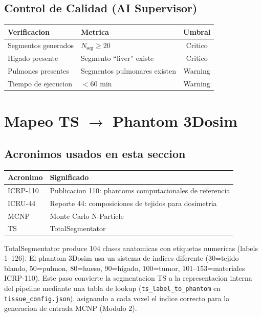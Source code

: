 \documentclass[12pt,a4paper]{article}
\begin{document}
\subsection{Control de Calidad (AI Supervisor)}

\begin{table}[H]
\centering
\begin{tabular}{llc}
\toprule
\textbf{Verificacion} & \textbf{Metrica} & \textbf{Umbral} \\
\midrule
Segmentos generados & $N_{\text{seg}} \geq 20$ & Critico \\
Higado presente & Segmento ``liver'' existe & Critico \\
Pulmones presentes & Segmentos pulmonares existen & Warning \\
Tiempo de ejecucion & $< 60$ min & Warning \\
\bottomrule
\end{tabular}
\end{table}

\newpage

\section{Mapeo TS \texorpdfstring{$\to$}{a} Phantom 3Dosim}
\label{sec:mapeo}

\subsection*{Acronimos usados en esta seccion}
\begin{tabular}{ll}
\toprule
\textbf{Acronimo} & \textbf{Significado} \\
\midrule
ICRP-110 & Publicacion 110: phantoms computacionales de referencia \\
ICRU-44 & Reporte 44: composiciones de tejidos para dosimetria \\
MCNP & Monte Carlo N-Particle \\
TS & TotalSegmentator \\
\bottomrule
\end{tabular}

TotalSegmentator produce 104 clases anatomicas con etiquetas numericas (labels 1--126). El
phantom 3Dosim usa un sistema de indices diferente ($30$=tejido blando, $50$=pulmon, $80$=hueso,
$90$=higado, $100$=tumor, $101$--$153$=materiales ICRP-110). Este paso convierte la segmentacion
TS a la representacion interna del pipeline mediante una tabla de lookup
(\texttt{ts\_label\_to\_phantom} en \texttt{tissue\_config.json}), asignando a cada voxel el
indice correcto para la generacion de entrada MCNP (Modulo 2).
\end{document}
